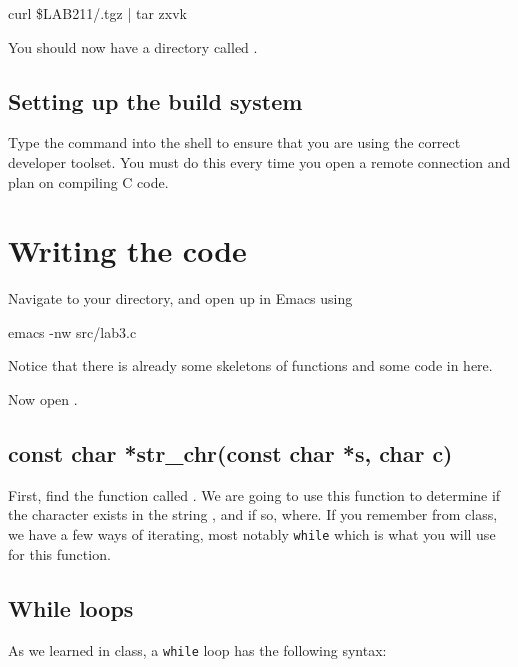 \documentclass{tufte-handout}
\begin{document}
\begin{CmdLine*}
  \C curl \$LAB211/\ThisLabBase.tgz | tar zxvk\\
\end{CmdLine*}

You should now have a directory called \filename{\ThisLabBase}.

\subsection{Setting up the build system}
Type the  command into the shell to ensure that you are
using the correct developer toolset. You must do this every time you
open a remote connection and plan on compiling C code.

\section{Writing the code}
Navigate to your \filename{\ThisLabBase} directory, and open up
 in Emacs using
\begin{CmdLine*}
  \C emacs -nw src/lab3.c\\
\end{CmdLine*}

\noindent
Notice that there is already some skeletons of functions and some code in  here.

Now open .

\subsection{{const char *str\_chr(const char *s, char c)}}
First, find the function called
.
We are going to use this function to determine if the character
 exists in the string , and if so, where. If you
remember from class, we have a few ways of iterating, most notably
\texttt{while} which is what you will use for this function.

\subsection{While loops}
As we learned in class, a \texttt{while} loop has the following
syntax:
\end{document}
